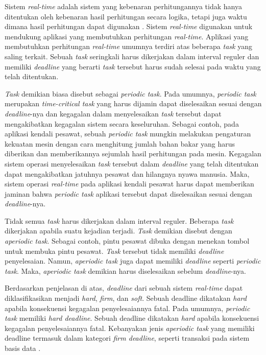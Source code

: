 Sistem \textit{real-time} adalah sistem yang kebenaran perhitungannya tidak hanya ditentukan
oleh kebenaran hasil perhitungan secara logika, tetapi juga waktu dimana hasil perhitungan dapat
digunakan \citep[pp.~6-7]{Shin1994}.  Sistem \textit{real-time} digunakan untuk mendukung
aplikasi yang membutuhkan perhitungan \textit{real-time}.  Aplikasi yang membutuhkan perhitungan
\textit{real-time} umumnya terdiri atas beberapa \textit{task} yang saling terkait.  Sebuah
\textit{task} seringkali harus dikerjakan dalam interval reguler dan memiliki \textit{deadline}
yang berarti \textit{task} tersebut harus sudah selesai pada waktu yang telah ditentukan.

\textit{Task} demikian biasa disebut sebagai \textit{periodic task}.  Pada umumnya,
\textit{periodic task} merupakan \textit{time-critical task} yang harus dijamin dapat
diselesaikan sesuai dengan \textit{deadline}-nya dan kegagalan dalam menyelesaikan \textit{task}
tersebut dapat mengakibatkan kegagalan sistem secara keseluruhan.  Sebagai contoh, pada aplikasi
kendali pesawat, sebuah \textit{periodic task} mungkin melakukan pengaturan kekuatan mesin
dengan cara menghitung jumlah bahan bakar yang harus diberikan dan memberikannya sejumlah hasil
perhitungan pada mesin.  Kegagalan sistem operasi menyelesaikan \textit{task} tersebut dalam
\textit{deadline} yang telah ditentukan dapat mengakibatkan jatuhnya pesawat dan hilangnya nyawa
manusia.  Maka, sistem operasi \textit{real-time} pada aplikasi kendali pesawat harus dapat
memberikan jaminan bahwa \textit{periodic task} aplikasi tersebut dapat diselesaikan sesuai
dengan \textit{deadline}-nya.

Tidak semua \textit{task} harus dikerjakan dalam interval reguler. Beberapa \textit{task}
dikerjakan apabila suatu kejadian terjadi.  \textit{Task} demikian disebut dengan
\textit{aperiodic task}.  Sebagai contoh, pintu pesawat dibuka dengan menekan tombol untuk
membuka pintu pesawat.  \textit{Task} tersebut tidak memiliki \textit{deadline} penyelesaian.
Namun, \textit{aperiodic task} juga dapat memiliki \textit{deadline} seperti \textit{periodic
task}.  Maka, \textit{aperiodic task} demikian harus diselesaikan sebelum \textit{deadline}-nya.

Berdasarkan penjelasan di atas, \textit{deadline} dari sebuah sistem \textit{real-time} dapat
diklasifikasikan menjadi \textit{hard}, \textit{firm}, dan \textit{soft}.  Sebuah deadline
dikatakan \textit{hard} apabila konsekuensi kegagalan penyelesaiannya fatal.  Pada umumnya,
\textit{periodic task} memiliki \textit{hard deadline}.  Sebuah deadline dikatakan \textit{hard}
apabila konsekuensi kegagalan penyelesaiannya fatal.  Kebanyakan jenis \textit{aperiodic task}
yang memiliki deadline termasuk dalam kategori \textit{firm deadline}, seperti transaksi pada
sistem basis data \citep[pp.~203-241]{Haritsa1992}.

